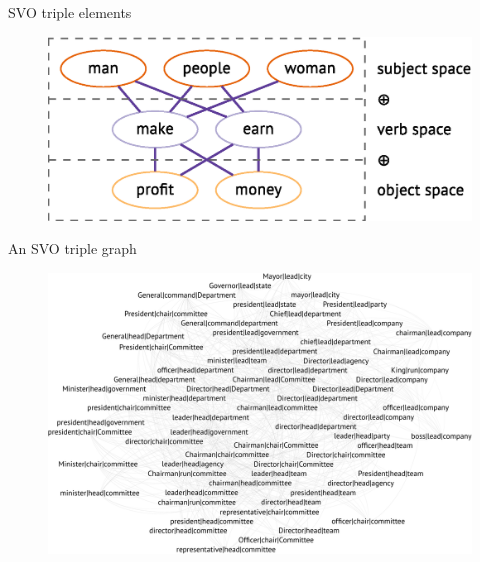 \begin{frame}{SVO triple elements}


\begin{figure}
  \centering
  \includegraphics[width=\columnwidth]{figures/triples}
\end{figure}
	
\end{frame}




\begin{frame}{An SVO triple graph}

\begin{figure}
  \centering
  \includegraphics[width=.9\textwidth]{figures/lead}
  
\end{figure}
	
\end{frame}




